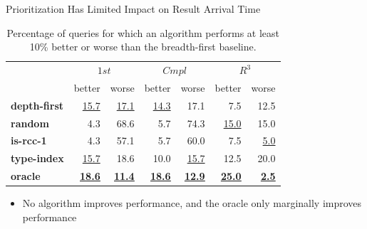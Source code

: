 \begin{frame}{Prioritization Has Limited Impact on Result Arrival Time}
  \small %
  \captionsetup[table]{skip=10pt, font=footnotesize }
  \begin{table}[!ht]
    \centering
    \begin{adjustbox}{width=0.9\textwidth} %
      \begin{tabular}{l|rr|rr|rr}
        & \multicolumn{2}{c}{$1st$} & \multicolumn{2}{c}{$Cmpl$} & \multicolumn{2}{c}{$R^{3}$} \\
        & better & worse & better & worse & better & worse  \\
        \midrule
        \bf depth-first & \underline{15.7} & \underline{17.1} & \underline{14.3} & 17.1 & 7.5 & 12.5  \\
        \bf random & 4.3 & 68.6 & 5.7 & 74.3 & \underline{15.0} & 15.0 \\
        \hline
        \bf is-rcc-1 & 4.3 & 57.1 & 5.7 & 60.0 & 7.5 & \underline{5.0} \\
        \hline
        \bf type-index & \underline{15.7} & 18.6 & 10.0 & \underline{15.7} & 12.5 & 20.0 \\
        \hline
        \bf oracle & \underline{\underline{\textbf{18.6}}} & \underline{\underline{\textbf{11.4}}} 
        & \underline{\underline{\textbf{18.6}}} & \underline{\underline{\textbf{12.9}}} 
        & \underline{\underline{\textbf{25.0}}} & \underline{\underline{\textbf{2.5}}} \\
      \end{tabular}
    \end{adjustbox}
    \caption{Percentage of queries for which an algorithm performs at least 10\% better or worse than the breadth-first baseline.}
  \end{table}
  \begin{itemize}
    \item No algorithm improves performance, and the oracle only marginally improves performance
  \end{itemize}
\end{frame}